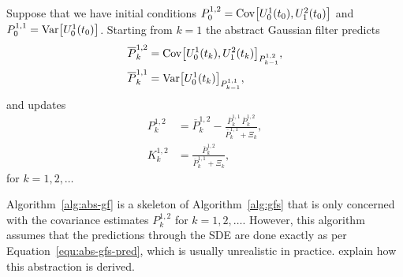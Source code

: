 \begin{algorithm}
	\label{alg:abs-gf}
	Suppose that we have initial conditions $P^{1, 2}_0 = \operatorname{Cov} \bigl[ U^1_0(t_0), U^2_1(t_0) \bigr]$ and $P^{1,1}_0=\operatorname{Var} \bigl[ U^1_0(t_0) \bigr]$. Starting from $k=1$ the abstract Gaussian filter predicts
	\begin{equation}
		\begin{split}
			\overline{P}^{1, 2}_k &= \operatorname{Cov} \bigl[ U^1_0(t_k), U^2_1(t_k) \bigr]_{P^{1, 2}_{k-1}},\\
			\overline{P}^{1, 1}_k &= \operatorname{Var} \bigl[ U^1_0(t_k) \bigr]_{P^{1, 1}_{k-1}},
			\label{equ:abs-gfs-pred}
		\end{split}
	\end{equation}
	and updates
	\begin{equation}
		\begin{split}
			P^{1, 2}_k &= \overline{P}^{1, 2}_k - \frac{\overline{P}^{1, 1}_k \, \overline{P}^{1, 2}_k}{\overline{P}^{1, 1}_k + \Xi_k},\\
			K^{1, 2}_k &= \frac{\overline{P}^{1, 2}_k}{\overline{P}^{1, 1}_k + \Xi_k},
		\end{split}
	\end{equation}
	for $k=1,2,\ldots$
\end{algorithm}
\begin{remark}
	Algorithm~\ref{alg:abs-gf} is a skeleton of Algorithm~\ref{alg:gfs} that is only concerned with the covariance estimates $P^{1, 2}_k$ for $k=1,2,\ldots$. However, this algorithm assumes that the predictions through the SDE are done exactly as per Equation~\eqref{equ:abs-gfs-pred}, which is usually unrealistic in practice. \citet{Zhao2020SSDGP} explain how this abstraction is derived.
\end{remark}

